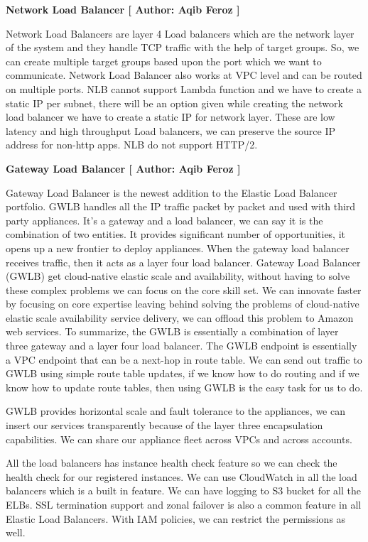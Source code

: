 \textbf{Network Load Balancer [ Author: Aqib Feroz ]}

Network Load Balancers are layer 4 Load balancers which are the network layer of the system and they handle TCP traffic with the help of target groups. So, we can create multiple target groups based upon the port which we want to communicate. Network Load Balancer also works at VPC level and can be routed on multiple ports. NLB cannot support Lambda function and we have to create a static IP per subnet, there will be an option given while creating the network load balancer we have to create a static IP for network layer. These are low latency and high throughput Load balancers, we can preserve the source IP address for non-http apps. NLB do not support HTTP/2.

\textbf{Gateway Load Balancer [ Author: Aqib Feroz ]}

Gateway Load Balancer is the newest addition to the Elastic Load Balancer portfolio. GWLB handles all the  IP traffic packet by packet and used with third party appliances. It's a gateway and a load balancer, we can say it is the combination of two entities. It provides significant number of opportunities, it opens up a new frontier to deploy appliances. When the gateway load balancer receives traffic, then it acts as a layer four load balancer. Gateway Load Balancer (GWLB) get cloud-native elastic scale and availability, without having to solve these complex problems we can focus on the core skill set. We can innovate faster by focusing on core expertise leaving behind solving the problems of cloud-native elastic scale availability service delivery, we can offload this problem to Amazon web services. To summarize, the GWLB is essentially a combination of layer three gateway and a layer four load balancer. The GWLB endpoint is essentially a VPC endpoint that can be a next-hop in route table. We can send out traffic to GWLB using simple route table updates, if we know how to do routing and if we know how to update route tables, then using GWLB is the easy task for us to do.

GWLB provides horizontal scale and fault tolerance to the appliances, we can insert our services transparently because of the layer three encapsulation capabilities. We can share our appliance fleet across VPCs and across accounts.


All the load balancers has instance health check feature so we can check the health check for our registered instances. We can use CloudWatch in all the load balancers which is a built in feature. We can have logging to S3 bucket for all the ELBs. SSL termination support and zonal failover is also a common feature in all Elastic Load Balancers. With IAM policies, we can restrict the permissions as well. 

